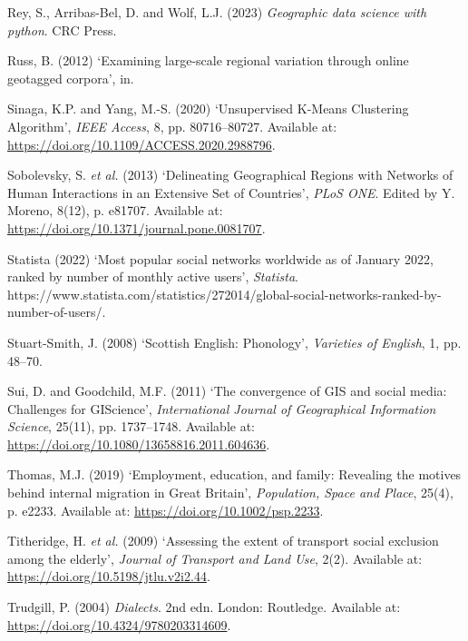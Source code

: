\documentclass[
]{article}
\newlength{\cslhangindent}
\newenvironment{CSLReferences}[2] %
 {\begin{list}{}{%
  \setlength{\itemindent}{0pt}
  \setlength{\leftmargin}{0pt}
  \setlength{\parsep}{0pt}
  \ifodd #1
   \setlength{\leftmargin}{\cslhangindent}
   \setlength{\itemindent}{-1\cslhangindent}
  \fi
  \setlength{\itemsep}{#2\baselineskip}}}
 {\end{list}}
\begin{document}
\begin{CSLReferences}{0}{1}
Rey, S., Arribas-Bel, D. and Wolf, L.J. (2023) \emph{Geographic data
science with python}. {CRC Press}.

Russ, B. (2012) {`Examining large-scale regional variation through
online geotagged corpora'}, in.

Sinaga, K.P. and Yang, M.-S. (2020) {`Unsupervised {K-Means Clustering
Algorithm}'}, \emph{IEEE Access}, 8, pp. 80716--80727. Available at:
\url{https://doi.org/10.1109/ACCESS.2020.2988796}.

Sobolevsky, S. \emph{et al.} (2013) {`Delineating {Geographical Regions}
with {Networks} of {Human Interactions} in an {Extensive Set} of
{Countries}'}, \emph{PLoS ONE}. Edited by Y. Moreno, 8(12), p. e81707.
Available at: \url{https://doi.org/10.1371/journal.pone.0081707}.

Statista (2022) {`Most popular social networks worldwide as of {January}
2022, ranked by number of monthly active users'}, \emph{Statista}.
https://www.statista.com/statistics/272014/global-social-networks-ranked-by-number-of-users/.

Stuart-Smith, J. (2008) {`Scottish {English}: {Phonology}'},
\emph{Varieties of English}, 1, pp. 48--70.

Sui, D. and Goodchild, M.F. (2011) {`The convergence of {GIS} and social
media: Challenges for {GIScience}'}, \emph{International Journal of
Geographical Information Science}, 25(11), pp. 1737--1748. Available at:
\url{https://doi.org/10.1080/13658816.2011.604636}.

Thomas, M.J. (2019) {`Employment, education, and family: {Revealing} the
motives behind internal migration in {Great Britain}'},
\emph{Population, Space and Place}, 25(4), p. e2233. Available at:
\url{https://doi.org/10.1002/psp.2233}.

Titheridge, H. \emph{et al.} (2009) {`Assessing the extent of transport
social exclusion among the elderly'}, \emph{Journal of Transport and
Land Use}, 2(2). Available at:
\url{https://doi.org/10.5198/jtlu.v2i2.44}.

Trudgill, P. (2004) \emph{Dialects}. 2nd edn. {London}: {Routledge}.
Available at: \url{https://doi.org/10.4324/9780203314609}.


\end{CSLReferences}
\end{document}
